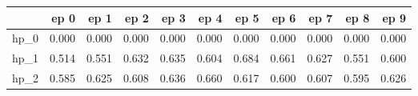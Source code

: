 \begin{tabular}{lrrrrrrrrrr}
\toprule
{} &   ep 0 &   ep 1 &   ep 2 &   ep 3 &   ep 4 &   ep 5 &   ep 6 &   ep 7 &   ep 8 &   ep 9 \\
\midrule
hp\_0 &  0.000 &  0.000 &  0.000 &  0.000 &  0.000 &  0.000 &  0.000 &  0.000 &  0.000 &  0.000 \\
hp\_1 &  0.514 &  0.551 &  0.632 &  0.635 &  0.604 &  0.684 &  0.661 &  0.627 &  0.551 &  0.600 \\
hp\_2 &  0.585 &  0.625 &  0.608 &  0.636 &  0.660 &  0.617 &  0.600 &  0.607 &  0.595 &  0.626 \\
\bottomrule
\end{tabular}
